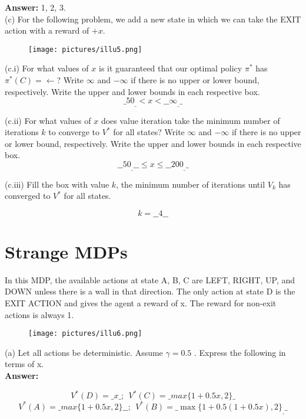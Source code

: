 \documentclass{article}
\begin{document}
\textbf{Answer:} 1, 2, 3. \\

\noindent (c) For the following problem, we add a new state in which we can take the EXIT action with a reward of $+x$.
\begin{figure}[h]
\centering
\texttt{[image: pictures/illu5.png]}
\end{figure}

\noindent (c.i) For what values of $x$ is it guaranteed that our optimal policy $\pi^*$ has $\pi^*(C) = \leftarrow$? Write $\infty$ and $-\infty$ if there is no upper or lower bound, respectively. Write the upper and lower bounds in each respective box.
$$\_50_\_<x<\_\_\infty_\_\_$$


\noindent (c.ii) For what values of $x$ does value iteration take the minimum number of iterations $k$ to converge to $V^*$ for all states? Write $\infty$ and $-\infty$ if there is no upper or lower bound, respectively. Write the upper and lower bounds in each respective box.
$$\_\_50_\_\_\_\le x\le \_\_200_\_\_$$

\noindent (c.iii) Fill the box with value $k$, the minimum number of iterations until $V_k$ has converged to $V^*$ for all states.

$$k = \_\_4\_\_$$


\newpage
\section{Strange MDPs}

\noindent In this MDP, the available actions at state A, B, C are LEFT, RIGHT, UP, and DOWN unless there is a wall in that direction. The only action at state D is the EXIT ACTION and gives the agent a reward of x. The reward for non-exit actions is always 1.
\begin{figure}[h]
\centering
\texttt{[image: pictures/illu6.png]}
\end{figure}

\noindent(a) Let all actions be deterministic. Assume $\gamma = 0.5$ . Express the following in terms of x. \\ 

\textbf{Answer:}

$$V^*(D) = \_x\_; ~~ V^*(C) = \_max\{1 + 0.5x, 2\}\_$$
$$V^*(A) = \_max\{1 + 0.5x, 2\}\_\_; ~~ V^*(B) = \_\max\{1 + 0.5(1 + 0.5x), 2\}_\_\_$$

~\\
\end{document}
